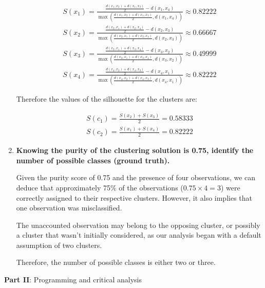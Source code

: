\documentclass[12pt]{article}
\begin{document}
\begin{enumerate}[leftmargin=\labelsep]
          \begin{align*}
              S(x_1) = \frac{\frac{d(x_1, x_2) + d(x_1, x_3)}{2} - d(x_1,x_4)}{\max(\frac{d(x_1, x_2) + d(x_1, x_3)}{2}, d(x_1,x_4))} \approx 0.82222 \\
              S(x_2) = \frac{\frac{d(x_2, x_1) + d(x_2, x_4)}{2} - d(x_2,x_3)}{\max(\frac{d(x_2, x_1) + d(x_2, x_4)}{2}, d(x_2,x_3))} \approx 0.66667 \\
              S(x_3) = \frac{\frac{d(x_3, x_1) + d(x_3, x_4)}{2} - d(x_3,x_2)}{\max(\frac{d(x_3, x_1) + d(x_3, x_4)}{2}, d(x_3,x_2))} \approx 0.49999 \\
              S(x_4) = \frac{\frac{d(x_4, x_2) + d(x_4, x_3)}{2} - d(x_4,x_1)}{\max(\frac{d(x_4, x_2) + d(x_4, x_3)}{2}, d(x_4,x_1))} \approx 0.82222
           \end{align*}

           Therefore the values of the silhouette for the clusters are:

          \begin{align*}
              S(c_1) = \frac{S(x_2) + S(x_3)}{2} = 0.58333 \\
              S(c_2) = \frac{S(x_1) + S(x_4)}{2} = 0.82222
           \end{align*}


    \item \textbf{Knowing the purity of the clustering solution is 0.75, identify the number of possible classes (ground truth).}

          \vskip 0.3cm
          Given the purity score of 0.75 and the presence of four observations, we can deduce that approximately 75\% of the observations ($0.75 \times 4 = 3$) 
           were correctly assigned to their respective clusters. However, it also implies that one observation was misclassified.

          The unaccounted observation may belong to the opposing cluster, or possibly a cluster that wasn't initially considered, as our analysis began with a 
           default assumption of two clusters.

          Therefore, the number of possible classes is either two or three.
          
\end{enumerate}

\vskip 0.5cm

\begin{center}
\large{\textbf{Part II}: Programming and critical analysis}\normalsize
\end{center}
\end{document}
